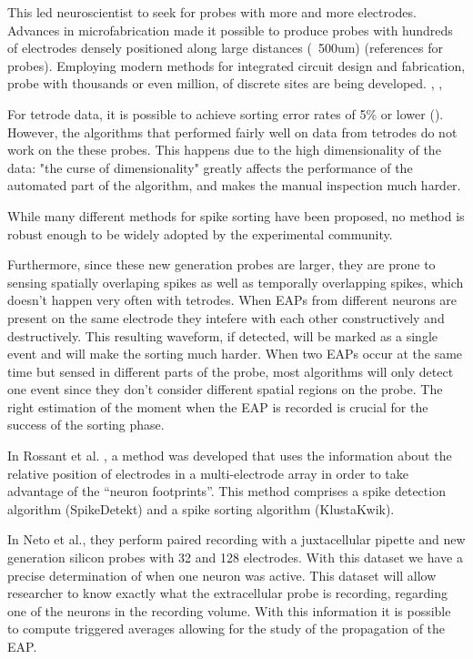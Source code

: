 This led neuroscientist to seek for probes with more and more electrodes. Advances in microfabrication made it possible to produce probes with hundreds of electrodes densely positioned along large distances (~500um) (references for probes). Employing modern methods for integrated circuit design and fabrication, probe with thousands or even million, of discrete sites are being developed. \cite{dombovari2014vivo}, \cite{ruther2015new}, \cite{shobe2015brain}

For tetrode data, it is possible to achieve sorting error rates of 5\% or lower (\cite{harris2000accuracy}). However, the algorithms that performed fairly well on data from tetrodes do not work on the these probes. This happens due to the high dimensionality of the data: "the curse of dimensionality" greatly affects the performance of the automated part of the algorithm, and makes the manual inspection much harder.

While many different methods for spike sorting have been proposed, no method is robust enough to be widely adopted by the experimental community.

Furthermore, since these new generation probes are larger, they are prone to sensing spatially overlaping spikes as well as temporally overlapping spikes, which doesn't happen very often with tetrodes. When EAPs from different neurons are present on the same electrode they intefere with each other constructively and destructively. This resulting waveform, if detected, will be marked as a single event and will make the sorting much harder. When two EAPs occur at the same time but sensed in different parts of the probe, most algorithms will only detect one event since they don't consider different spatial regions on the probe. The right estimation of the moment when the EAP is recorded is crucial for the success of the sorting phase. 

In Rossant et al. \cite{Rossant2016}, a method was developed that uses the information about the relative position of electrodes in a multi-electrode array in order to take advantage of the “neuron footprints”. This method comprises a spike detection algorithm (SpikeDetekt) and a spike sorting algorithm (KlustaKwik).

In Neto et al., they perform paired recording with a juxtacellular pipette and new generation silicon probes with 32 and 128 electrodes. With this dataset we have a precise determination of when one neuron was active. This dataset will allow researcher to know exactly what the extracellular probe is recording, regarding one of the neurons in the recording volume. With this information it is possible to compute triggered averages allowing for the study of the propagation of the EAP.

